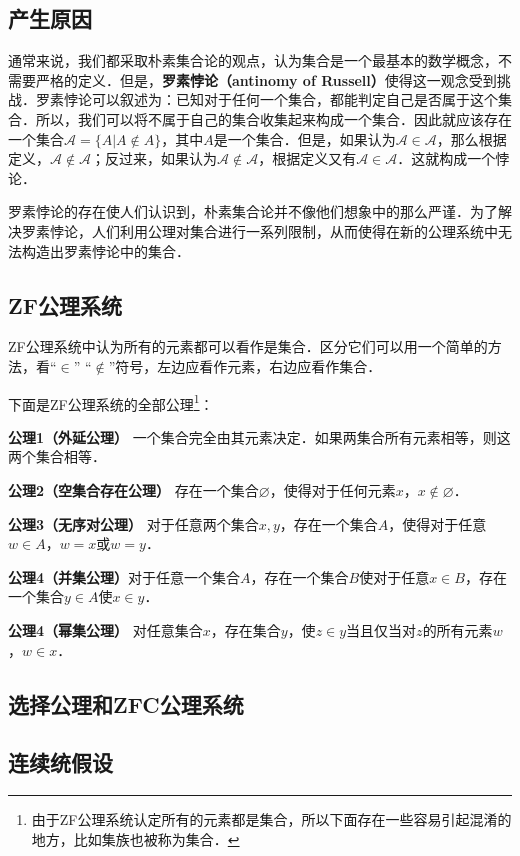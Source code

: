 \begin{issues}
\issueTODO
\end{issues}

\subsection{产生原因}
通常来说，我们都采取朴素集合论的观点，认为集合是一个最基本的数学概念，不需要严格的定义．但是，\textbf{罗素悖论（antinomy of Russell）}使得这一观念受到挑战．罗素悖论可以叙述为：已知对于任何一个集合，都能判定自己是否属于这个集合．所以，我们可以将不属于自己的集合收集起来构成一个集合．因此就应该存在一个集合$\mathcal{A}=\{A|A\notin A\}$，其中$A$是一个集合．但是，如果认为$\mathcal{A}\in\mathcal{A}$，那么根据定义，$\mathcal{A}\notin\mathcal{A}$；反过来，如果认为$\mathcal{A}\notin\mathcal{A}$，根据定义又有$\mathcal{A}\in\mathcal{A}$．这就构成一个悖论．

罗素悖论的存在使人们认识到，朴素集合论并不像他们想象中的那么严谨．为了解决罗素悖论，人们利用公理对集合进行一系列限制，从而使得在新的公理系统中无法构造出罗素悖论中的集合．

\subsection{ZF公理系统}
ZF公理系统中认为所有的元素都可以看作是集合．区分它们可以用一个简单的方法，看“$\in$” “$\notin$”符号，左边应看作元素，右边应看作集合．

下面是ZF公理系统的全部公理\footnote{由于ZF公理系统认定所有的元素都是集合，所以下面存在一些容易引起混淆的地方，比如集族也被称为集合．}：

\textbf{公理1（外延公理）} 一个集合完全由其元素决定．如果两集合所有元素相等，则这两个集合相等．

\textbf{公理2（空集合存在公理）} 存在一个集合$\varnothing$，使得对于任何元素$x$，$x\notin\varnothing$．

\textbf{公理3（无序对公理）} 对于任意两个集合$x,y$，存在一个集合$A$，使得对于任意$w\in A$，$w=x$或$w=y$．

\textbf{公理4（并集公理）}对于任意一个集合$A$，存在一个集合$B$使对于任意$x\in B$，存在一个集合$y\in A$使$x\in y$．

\textbf{公理4（幂集公理）} 对任意集合$x$，存在集合$y$，使$z∈y$当且仅当对$z$的所有元素$w$，$w\in x$．

\subsection{选择公理和ZFC公理系统}

\subsection{连续统假设}



